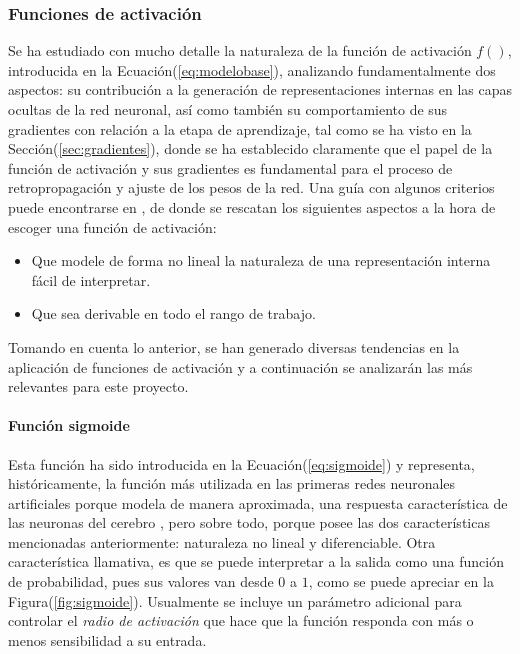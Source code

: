         \subsubsection{Funciones de activación}
        Se ha estudiado con mucho detalle la naturaleza de la función de activación $f()$, introducida en la 
        Ecuación(\ref{eq:modelobase}), analizando fundamentalmente dos aspectos: su contribución a la generación 
        de representaciones internas en las capas ocultas de la red neuronal, así como también su comportamiento 
        de sus gradientes con relación a la etapa de aprendizaje, tal como se ha visto en la Sección(\ref{sec:gradientes}), 
        donde se ha establecido claramente que el papel de la función de activación y sus gradientes es fundamental para 
        el proceso de retropropagación y ajuste de los pesos de la red. Una guía con algunos criterios puede 
        encontrarse en \cite{mhaskar1994choose}, de donde se rescatan los siguientes aspectos a la hora de escoger una 
        función de activación:
        \begin{itemize}
            \item Que modele de forma no lineal la naturaleza de una representación interna fácil de interpretar.
            \item Que sea derivable en todo el rango de trabajo.
        \end{itemize}

        Tomando en cuenta lo anterior, se han generado diversas tendencias en la aplicación de funciones de activación y a 
        continuación se analizarán las más relevantes para este proyecto.
            \paragraph{Función sigmoide}\label{sec:sigmoide}
            Esta función ha sido introducida en la Ecuación(\ref{eq:sigmoide}) y representa, históricamente, la función 
            más utilizada en las primeras redes neuronales artificiales porque modela de manera aproximada, una respuesta 
            característica de las neuronas del cerebro \cite{narayan1997generalized}, pero sobre todo, porque posee las dos características mencionadas 
            anteriormente: naturaleza no lineal y diferenciable. Otra característica llamativa, es que se puede interpretar 
            a la salida como una función de probabilidad, pues sus valores van desde $0$ a $1$, como se puede apreciar 
            en la Figura(\ref{fig:sigmoide}). Usualmente se incluye un parámetro adicional para controlar el \textit{radio de activación}
            que hace que la función responda con más o menos sensibilidad a su entrada.

